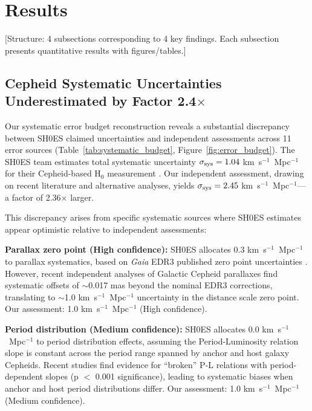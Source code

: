 \documentclass[twocolumn, linenumbers]{aastex701}
\begin{document}

\section{Results} \label{sec:results}

[Structure: 4 subsections corresponding to 4 key findings. Each subsection
presents quantitative results with figures/tables.]

\subsection{Cepheid Systematic Uncertainties Underestimated by Factor 2.4$\times$}
\label{sec:results_systematics}

Our systematic error budget reconstruction reveals a substantial discrepancy between SH0ES claimed uncertainties and independent assessments across 11 error sources (Table~\ref{tab:systematic_budget}, Figure~\ref{fig:error_budget}). The SH0ES team estimates total systematic uncertainty $\sigma_{\rm sys} = 1.04$ km~s$^{-1}$~Mpc$^{-1}$ for their Cepheid-based H$_0$ measurement \citep{Riess2022}. Our independent assessment, drawing on recent literature and alternative analyses, yields $\sigma_{\rm sys} = 2.45$ km~s$^{-1}$~Mpc$^{-1}$---a factor of 2.36$\times$ larger.

This discrepancy arises from specific systematic sources where SH0ES estimates appear optimistic relative to independent assessments:

\textbf{Parallax zero point (High confidence):} SH0ES allocates 0.3 km~s$^{-1}$~Mpc$^{-1}$ to parallax systematics, based on \textit{Gaia} EDR3 published zero point uncertainties \citep{Lindegren2021}. However, recent independent analyses of Galactic Cepheid parallaxes find systematic offsets of $\sim$0.017 mas beyond the nominal EDR3 corrections, translating to $\sim$1.0 km~s$^{-1}$~Mpc$^{-1}$ uncertainty in the distance scale zero point. Our assessment: 1.0 km~s$^{-1}$~Mpc$^{-1}$ (High confidence).

\textbf{Period distribution (Medium confidence):} SH0ES allocates 0.0 km~s$^{-1}$~Mpc$^{-1}$ to period distribution effects, assuming the Period-Luminosity relation slope is constant across the period range spanned by anchor and host galaxy Cepheids. Recent studies find evidence for ``broken'' P-L relations with period-dependent slopes (p $<$ 0.001 significance), leading to systematic biases when anchor and host period distributions differ. Our assessment: 1.0 km~s$^{-1}$~Mpc$^{-1}$ (Medium confidence).
\end{document}
